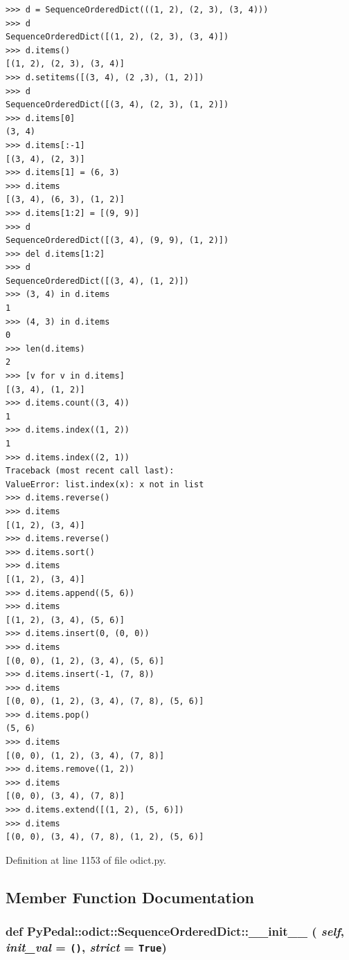 \begin{verbatim}
>>> d = SequenceOrderedDict(((1, 2), (2, 3), (3, 4)))
>>> d
SequenceOrderedDict([(1, 2), (2, 3), (3, 4)])
>>> d.items()
[(1, 2), (2, 3), (3, 4)]
>>> d.setitems([(3, 4), (2 ,3), (1, 2)])
>>> d
SequenceOrderedDict([(3, 4), (2, 3), (1, 2)])
>>> d.items[0]
(3, 4)
>>> d.items[:-1]
[(3, 4), (2, 3)]
>>> d.items[1] = (6, 3)
>>> d.items
[(3, 4), (6, 3), (1, 2)]
>>> d.items[1:2] = [(9, 9)]
>>> d
SequenceOrderedDict([(3, 4), (9, 9), (1, 2)])
>>> del d.items[1:2]
>>> d
SequenceOrderedDict([(3, 4), (1, 2)])
>>> (3, 4) in d.items
1
>>> (4, 3) in d.items
0
>>> len(d.items)
2
>>> [v for v in d.items]
[(3, 4), (1, 2)]
>>> d.items.count((3, 4))
1
>>> d.items.index((1, 2))
1
>>> d.items.index((2, 1))
Traceback (most recent call last):
ValueError: list.index(x): x not in list
>>> d.items.reverse()
>>> d.items
[(1, 2), (3, 4)]
>>> d.items.reverse()
>>> d.items.sort()
>>> d.items
[(1, 2), (3, 4)]
>>> d.items.append((5, 6))
>>> d.items
[(1, 2), (3, 4), (5, 6)]
>>> d.items.insert(0, (0, 0))
>>> d.items
[(0, 0), (1, 2), (3, 4), (5, 6)]
>>> d.items.insert(-1, (7, 8))
>>> d.items
[(0, 0), (1, 2), (3, 4), (7, 8), (5, 6)]
>>> d.items.pop()
(5, 6)
>>> d.items
[(0, 0), (1, 2), (3, 4), (7, 8)]
>>> d.items.remove((1, 2))
>>> d.items
[(0, 0), (3, 4), (7, 8)]
>>> d.items.extend([(1, 2), (5, 6)])
>>> d.items
[(0, 0), (3, 4), (7, 8), (1, 2), (5, 6)]
\end{verbatim}
\normalsize
 

Definition at line 1153 of file odict.py.

\subsection{Member Function Documentation}
\hypertarget{classPyPedal_1_1odict_1_1SequenceOrderedDict_622163e06c3058e0bbca95a379f21a00}{
\subsubsection{\setlength{\rightskip}{0pt plus 5cm}def PyPedal::odict::SequenceOrderedDict::\_\-\_\-init\_\-\_\- ( {\em self}, \/   {\em init\_\-val} = {\tt ()}, \/   {\em strict} = {\tt True})}}
\label{classPyPedal_1_1odict_1_1SequenceOrderedDict_622163e06c3058e0bbca95a379f21a00}




